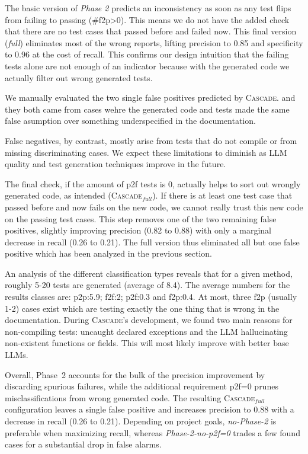 \documentclass[acmsmall, screen]{acmart}
\newcommand{\tool}{\textsc{Cascade}\xspace}
\begin{document}
The basic version of \textit{Phase 2} predicts an inconsistency as soon as any test flips from failing to passing (\#f2p\textgreater0). This means we do not have the added check that there are no test cases that passed before and failed now. This final version (\textit{full}) eliminates most of the wrong reports, lifting precision to 0.85 and specificity to 0.96 at the cost of recall. This confirms our design intuition that the failing tests alone are not enough of an indicator because with the generated code we actually filter out wrong generated tests.

We manually evaluated the two single false positives predicted by \tool.
and they both came from cases wehre the generated code and tests made the same false asumption over something underspecified in the documentation.

False negatives, by contrast, mostly arise from tests that do not compile or from missing discriminating cases. We expect these limitations to diminish as LLM quality and test generation techniques improve in the future.

The final check, if the amount of p2f tests is 0, actually helps to sort out wrongly generated code, as intended (\tool$_{full}$). If there is at least one test case that passed before and now fails on the new code, we cannot really trust this new code on the passing test cases.
This step removes one of the two remaining false positives, slightly improving precision (0.82 to 0.88) with only a marginal decrease in recall (0.26 to 0.21). 
The full version thus eliminated all but one false positive which has been analyzed in the previous section.

An analysis of the different classification types reveals that for a given method, roughly 5-20 tests are generated (average of 8.4). The average numbers for the results classes are: p2p:5.9; f2f:2; p2f:0.3 and f2p:0.4. 
At most, three f2p (usually 1-2) cases exist which are testing exactly the one thing that is wrong in the documentation. During \tool's development, we found two main reasons for non-compiling tests: uncaught declared exceptions and the LLM hallucinating non-existent functions or fields. This will most likely improve with better base LLMs.

Overall, Phase~2 accounts for the bulk of the precision improvement by discarding spurious failures, while the additional requirement p2f=0 prunes misclassifications from wrong generated code. The resulting \tool$_{full}$ configuration leaves a single false positive and increases precision to 0.88 with a decrease in recall (0.26 to 0.21). Depending on project goals, \textit{no-Phase-2} is preferable when maximizing recall, whereas \textit{Phase-2-no-p2f=0} trades a few found cases for a substantial drop in false alarms.
\end{document}
